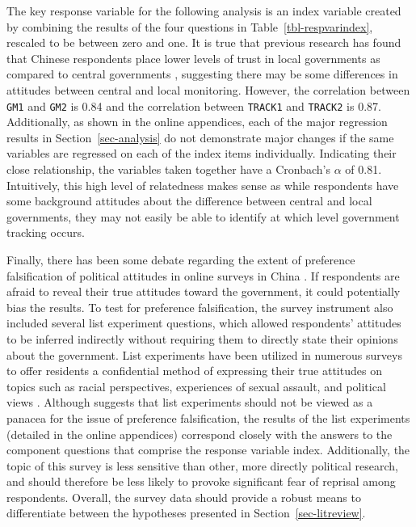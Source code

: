 \documentclass[
  number]{elsarticle}
\begin{document}
The key response variable for the following analysis is an index
variable created by combining the results of the four questions in
Table~\ref{tbl-respvarindex}, rescaled to be between zero and one. It is
true that previous research has found that Chinese respondents place
lower levels of trust in local governments as compared to central
governments \citep{chen2017, zhong2014}, suggesting there may be some
differences in attitudes between central and local monitoring. However,
the correlation between \texttt{GM1} and \texttt{GM2} is 0.84 and the
correlation between \texttt{TRACK1} and \texttt{TRACK2} is 0.87.
Additionally, as shown in the online appendices, each of the major
regression results in Section~\ref{sec-analysis} do not demonstrate
major changes if the same variables are regressed on each of the index
items individually. Indicating their close relationship, the variables
taken together have a Cronbach's \(\alpha\) of 0.81. Intuitively, this
high level of relatedness makes sense as while respondents have some
background attitudes about the difference between central and local
governments, they may not easily be able to identify at which level
government tracking occurs.

Finally, there has been some debate regarding the extent of preference
falsification of political attitudes in online surveys in China
\citep{carter2024, jiang2016, ratigan2020}. If respondents are afraid to
reveal their true attitudes toward the government, it could potentially
bias the results. To test for preference falsification, the survey
instrument also included several list experiment questions, which
allowed respondents' attitudes to be inferred indirectly without
requiring them to directly state their opinions about the government.
List experiments have been utilized in numerous surveys to offer
residents a confidential method of expressing their true attitudes on
topics such as racial perspectives, experiences of sexual assault, and
political views \citep{redlawsk2010, moseson2017}. Although
\citep{glynn2013} suggests that list experiments should not be viewed as
a panacea for the issue of preference falsification, the results of the
list experiments (detailed in the online appendices) correspond closely
with the answers to the component questions that comprise the response
variable index. Additionally, the topic of this survey is less sensitive
than other, more directly political research, and should therefore be
less likely to provoke significant fear of reprisal among respondents.
Overall, the survey data should provide a robust means to differentiate
between the hypotheses presented in Section~\ref{sec-litreview}.
\end{document}
